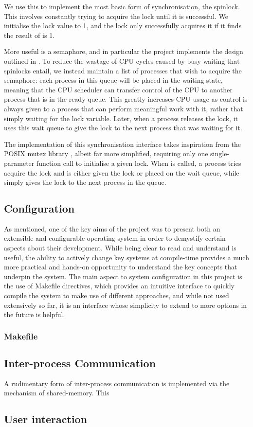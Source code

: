     We use this to implement the most basic form of synchronisation, the
    spinlock. This involves constantly trying to acquire the lock until it is
    successful. We initialise the lock value to 1, and the lock only
    successfully acquires it if it finds the result of  is 1.

    More useful is a semaphore, and in particular the project implements the
    design outlined in \cite[pg.~265]{DinosaurOS}. To reduce the wastage of CPU
    cycles caused by busy-waiting that spinlocks entail, we instead maintain a
    list of processes that wish to acquire the semaphore: each process in this
    queue will be placed in the waiting state, meaning that the CPU scheduler
    can transfer control of the CPU to another process that is in the ready
    queue. This greatly increases CPU usage as control is always given to a
    process that can perform meaningful work with it, rather that simply waiting
    for the lock variable. Later, when a process releases the lock, it uses this
    wait queue to give the lock to the next process that was waiting for it.

    The implementation of this synchronisation interface takes inspiration from
    the POSIX mutex library \cite{POSIX_mutex}, albeit far more simplified,
    requiring only one single-parameter function call to initialise a given
    lock. When  is called, a process tries acquire the lock
    and is either given the lock or placed on the wait queue, while
     simply gives the lock to the next process in the
    queue.

\subsection{Configuration}
    \label{sec:Configuration}
    As mentioned, one of the key aims of the project was to present both an
    extensible and configurable operating system in order to demystify certain
    aspects about their development. While being clear to read and understand is
    useful, the ability to actively change key systems at compile-time provides
    a much more practical and hands-on opportunity to understand the key
    concepts that underpin the system. The main aspect to system configuration
    in this project is the use of Makefile directives, which provides an
    intuitive interface to quickly compile the system to make use of different
    approaches, and while not used extensively so far, it is an interface whose
    simplicity to extend to more options in the future is helpful.

    \subsubsection{Makefile}

\subsection{Inter-process Communication}
    A rudimentary form of inter-process communication is implemented via the
    mechanism of shared-memory. This 
    
\subsection{User interaction}
